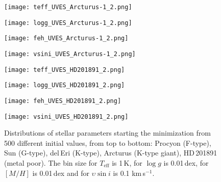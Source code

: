 \documentclass[fleqn,usenatbib]{mnras}
\begin{document}
\begin{figure*}
  \centering
 \begin{minipage}{0.21\textwidth}
  \texttt{[image: teff\_UVES\_Arcturus-1\_2.png]} 
 \end{minipage}
\hspace{0.02\textwidth}%
 \begin{minipage}{0.21\textwidth}
  \texttt{[image: logg\_UVES\_Arcturus-1\_2.png]} 
 \end{minipage}
\hspace{0.02\textwidth}%
 \begin{minipage}{0.21\textwidth}
  \texttt{[image: feh\_UVES\_Arcturus-1\_2.png]} 
 \end{minipage}
\hspace{0.02\textwidth}%
 \begin{minipage}{0.21\textwidth}
  \texttt{[image: vsini\_UVES\_Arcturus-1\_2.png]} 
 \end{minipage}

 \centering
 \begin{minipage}{0.21\textwidth}
  \texttt{[image: teff\_UVES\_HD201891\_2.png]} 
 \end{minipage}
\hspace{0.02\textwidth}%
 \begin{minipage}{0.21\textwidth}
  \texttt{[image: logg\_UVES\_HD201891\_2.png]} 
 \end{minipage}
\hspace{0.02\textwidth}%
 \begin{minipage}{0.21\textwidth}
  \texttt{[image: feh\_UVES\_HD201891\_2.png]} 
 \end{minipage}
\hspace{0.02\textwidth}%
 \begin{minipage}{0.21\textwidth}
  \texttt{[image: vsini\_UVES\_HD201891\_2.png]} 
 \end{minipage}

 \caption{Distributions of stellar parameters starting the minimization from 500 different initial values, from top to bottom: Procyon (F-type), Sun (G-type), del\,Eri (K-type), 
 Arcturus (K-type giant), HD\,201891 (metal poor). The bin size for $T_{\mathrm{eff}}$ is 1\,K, for $\log g$ is 0.01\,dex, for $[M/H]$ is 0.01\,dex and for $\upsilon\sin i$ is 0.1 km\,s$^{-1}$.} 
 \label{initial_distributions}
\end{figure*}
\end{document}
